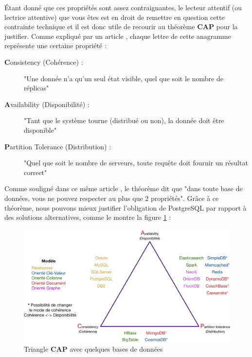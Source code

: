 \pagebreak

Étant donné que ces propriétés sont assez contraignantes, le lecteur attentif (ou lectrice attentive) que vous êtes est en droit de remettre en question cette contrainte technique et il est donc utile de recourir au théorème \textbf{CAP} pour la justifier.
Comme expliqué par un article \cite{acid_cap}, chaque lettre de cette anagramme représente une certaine propriété :
\begin{description}
    \item[\textbf{C}onsistency (Cohérence) :] "Une donnée n'a qu'un seul état visible, quel que soit le nombre de réplicas"
    \item[\textbf{A}vailability (Disponibilité) :] "Tant que le système tourne (distribué ou non), la donnée doit être disponible"
    \item[\textbf{P}artition Tolerance (Distribution) :] "Quel que soit le nombre de serveurs, toute requête doit fournir un résultat correct" 
\end{description}

Comme souligné dans ce même article \cite{acid_cap}, le théorème dit que "dans toute base de données, vous ne pouvez respecter au plus que 2 propriétés".
Grâce à ce théorème, nous pouvons mieux justifier l'obligation de PostgreSQL par rapport à des solutions alternatives, comme le montre la figure \ref{pic:capTriangleWithSomeDatabases} :

\begin{figure}[H]
    \includegraphics[width=\textwidth,height=\textheight,keepaspectratio]{images/triangleCAP_with_databases.png}
    \centering
    \caption[Triangle \textbf{CAP} avec quelques bases de données]{Triangle \textbf{CAP} avec quelques bases de données \cite{acid_cap}}
    \label{pic:capTriangleWithSomeDatabases}
\end{figure}